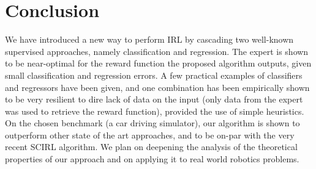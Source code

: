 \documentclass[smallextended]{svjour3}
\begin{document}
\section{Conclusion}
\label{sec:conclusion}
We have introduced a new way to perform IRL by cascading two well-known supervised approaches, namely classification and regression. The expert is shown to be near-optimal for the reward function the proposed algorithm outputs, given small classification and regression errors. A few practical examples of classifiers and regressors have been given, and one combination has been empirically shown to be very resilient to dire lack of data on the input (only data from the expert was used to retrieve the reward function), provided the use of simple heuristics. On the chosen benchmark (a car driving simulator), our algorithm is shown to outperform other state of the art approaches, and to be on-par with the very recent SCIRL algorithm. We plan on deepening the analysis of the theoretical properties of our approach and on applying it to real world robotics problems.


\end{document}
